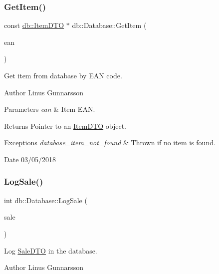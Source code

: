 \subsubsection{\texorpdfstring{Get\+Item()}{GetItem()}}
{\footnotesize\ttfamily const \mbox{\hyperlink{classdb_1_1ItemDTO}{db\+::\+Item\+D\+TO}} $\ast$ db\+::\+Database\+::\+Get\+Item (\begin{DoxyParamCaption}\item[{std\+::string}]{ean }\end{DoxyParamCaption})}

Get item from database by E\+AN code. \begin{DoxyAuthor}{Author}
Linus Gunnarsson 
\end{DoxyAuthor}

\begin{DoxyParams}{Parameters}
{\em ean} & Item E\+AN. \\
\hline
\end{DoxyParams}
\begin{DoxyReturn}{Returns}
Pointer to an \mbox{\hyperlink{classdb_1_1ItemDTO}{Item\+D\+TO}} object. 
\end{DoxyReturn}

\begin{DoxyExceptions}{Exceptions}
{\em database\+\_\+item\+\_\+not\+\_\+found} & Thrown if no item is found. \\
\hline
\end{DoxyExceptions}
\begin{DoxyDate}{Date}
03/05/2018 
\end{DoxyDate}
\mbox{\label{classdb_1_1Database_ac2aef162b74c917acdaf11794422c415}} 
\subsubsection{\texorpdfstring{Log\+Sale()}{LogSale()}}
{\footnotesize\ttfamily int db\+::\+Database\+::\+Log\+Sale (\begin{DoxyParamCaption}\item[{\mbox{\hyperlink{classdb_1_1SaleDTO}{db\+::\+Sale\+D\+TO}} $\ast$}]{sale }\end{DoxyParamCaption})}

Log \mbox{\hyperlink{classdb_1_1SaleDTO}{Sale\+D\+TO}} in the database. \begin{DoxyAuthor}{Author}
Linus Gunnarsson 
\end{DoxyAuthor}

